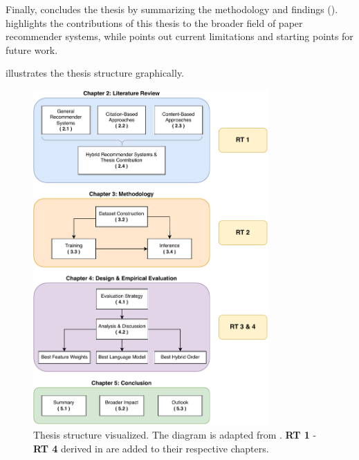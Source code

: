 Finally,  concludes the thesis by summarizing the methodology and findings ().
 highlights the contributions of this thesis to the broader field of paper recommender systems, while  points out current limitations and starting points for future work.

 illustrates the thesis structure graphically.

\begin{figure}[htb!]
    \centering
    \includegraphics[width=0.8\textwidth]{diagrams/thesis_outline.pdf}
    \caption[Thesis Structure]{Thesis structure visualized. The diagram is adapted from \cite{BreitingerAcademicLiterature2023}.
        \textbf{\ac{RT} 1} - \textbf{\ac{RT} 4} derived in  are added to their respective chapters.}
    \label{fig:thesis-outline}
\end{figure}